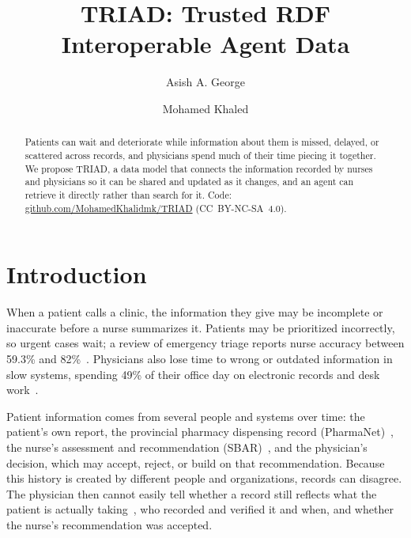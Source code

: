 \documentclass[sigconf]{acmart}
\begin{document}
\title{TRIAD: Trusted RDF Interoperable Agent Data}

\author{Asish A. George}

\author{Mohamed Khaled}

\begin{abstract}
\raggedright
Patients can wait and deteriorate while information about them is missed, delayed, or scattered across records, and physicians spend much of their time piecing it together. We propose TRIAD, a data model that connects the information recorded by nurses and physicians so it can be shared and updated as it changes, and an agent can retrieve it directly rather than search for it. Code: \url{github.com/MohamedKhalidmk/TRIAD} (\mbox{CC BY-NC-SA 4.0}).
\end{abstract}

\maketitle
\pagestyle{empty}

\section{Introduction}
When a patient calls a clinic, the information they give may be incomplete or inaccurate before a nurse summarizes it. Patients may be prioritized incorrectly, so urgent cases wait; a review of emergency triage reports nurse accuracy between 59.3\% and 82\%~\cite{triage}. Physicians also lose time to wrong or outdated information in slow systems, spending 49\% of their office day on electronic records and desk work~\cite{sinsky2016}.

Patient information comes from several people and systems over time: the patient's own report, the provincial pharmacy dispensing record (PharmaNet)~\cite{pharmanet}, the nurse's assessment and recommendation (SBAR)~\cite{sbar}, and the physician's decision, which may accept, reject, or build on that recommendation. Because this history is created by different people and organizations, records can disagree. The physician then cannot easily tell whether a record still reflects what the patient is actually taking~\cite{ismp}, who recorded and verified it and when, and whether the nurse's recommendation was accepted.
\end{document}
